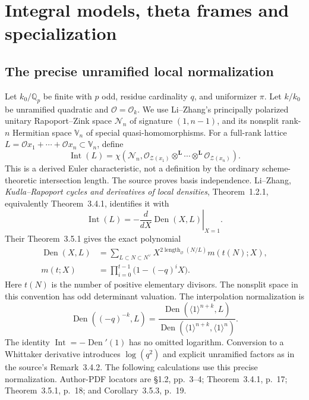 \documentclass[11pt]{article}
\newcommand{\Q}{\mathbb Q}\newcommand{\C}{\mathbb C}\newcommand{\Z}{\mathbb Z}\newcommand{\R}{\mathbb R}\newcommand{\A}{\mathbb A}\newcommand{\OO}{\mathcal O}
\theoremstyle{definition}\newtheorem{definition}[theorem]{Definition}\newtheorem{remark}[theorem]{Remark}
\begin{document}
\section{Integral models, theta frames and specialization}

\subsection{The precise unramified local normalization}

Let $k_0/\Q_p$ be finite with $p$ odd, residue cardinality $q$, and
uniformizer $\pi$. Let $k/k_0$ be unramified quadratic and
$\mathcal O=\mathcal O_k$. We use Li--Zhang's principally polarized
unitary Rapoport--Zink space $\mathcal N_n$ of signature $(1,n-1)$,
and its nonsplit rank-$n$ Hermitian space $\mathbb V_n$ of special
quasi-homomorphisms. For a full-rank lattice
$L=\mathcal O x_1+\cdots+\mathcal O x_n\subset\mathbb V_n$, define
\[
 \operatorname{Int}(L)=\chi\left(\mathcal N_n,
  \mathcal O_{\mathcal Z(x_1)}\otimes^{\mathbf L}\cdots
                    \otimes^{\mathbf L}\mathcal O_{\mathcal Z(x_n)}\right).
\]
This is a derived Euler characteristic, not a definition by the
ordinary scheme-theoretic intersection length. The source proves
basis independence. Li--Zhang, \emph{Kudla--Rapoport cycles and
derivatives of local densities}, Theorem~1.2.1, equivalently
Theorem~3.4.1, identifies it with
\[
 \operatorname{Int}(L)=-\left.\frac{d}{dX}
                           \operatorname{Den}(X,L)\right|_{X=1}.
\]
Their Theorem~3.5.1 gives the exact polynomial
\begin{align*}
 \operatorname{Den}(X,L)
 &=\sum_{L\subset N\subset N^\vee}
      X^{2\operatorname{length}_{\mathcal O}(N/L)}m(t(N);X),\\
 m(t;X)&=\prod_{i=0}^{t-1}\bigl(1-(-q)^iX\bigr).
\end{align*}
Here $t(N)$ is the number of positive elementary divisors. The
nonsplit space in this convention has odd determinant valuation.
The interpolation normalization is
\[
 \operatorname{Den}((-q)^{-k},L)
 =\frac{\operatorname{Den}(\langle1\rangle^{n+k},L)}
        {\operatorname{Den}(\langle1\rangle^{n+k},\langle1\rangle^n)}.
\]
The identity $\operatorname{Int}=-\operatorname{Den}'(1)$ has no
omitted logarithm. Conversion to a Whittaker derivative introduces
$\log(q^2)$ and explicit unramified factors as in the source's
Remark~3.4.2. The following calculations use this precise
normalization. Author-PDF locators are \S1.2, pp.~3--4;
Theorem~3.4.1, p.~17; Theorem~3.5.1, p.~18; and
Corollary~3.5.3, p.~19.
\end{document}
